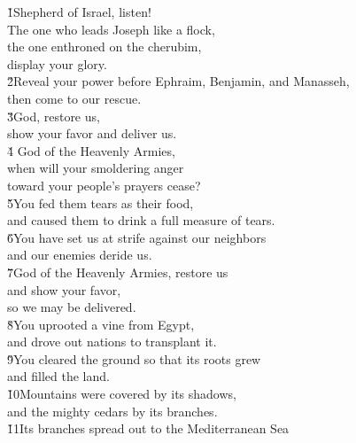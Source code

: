 \begin{poetry}
\poeml \v{1}Shepherd of Israel, listen! \\
\poemll    The one who leads Joseph like a flock, \\
\poeml the one enthroned on the cherubim, \\
\poemll    display your glory. \\
\poeml \v{2}Reveal your power before Ephraim, Benjamin, and Manasseh, \\
\poemll    then come to our rescue. \\
\poeml \v{3}God, restore us, \\
\poemll    show your favor and deliver us. \\
\poeml \v{4} God of the Heavenly Armies, \\
\poemll    when will your smoldering anger \\
\poemlll       toward your people's prayers cease? \\
\poeml \v{5}You fed them tears as their food, \\
\poemll    and caused them to drink a full measure of tears. \\
\poeml \v{6}You have set us at strife against our neighbors \\
\poemll    and our enemies deride us. \\
\poeml \v{7}God of the Heavenly Armies, restore us \\
\poemll    and show your favor, \\
\poemlll       so we may be delivered. \\
\poeml \v{8}You uprooted a vine from Egypt, \\
\poemll    and drove out nations to transplant it. \\
\poeml \v{9}You cleared the ground so that its roots grew \\
\poemll    and filled the land. \\
\poeml \v{10}Mountains were covered by its shadows, \\
\poemll    and the mighty cedars by its branches. \\
\poeml \v{11}Its branches spread out to the Mediterranean Sea \\

\end{poetry}
